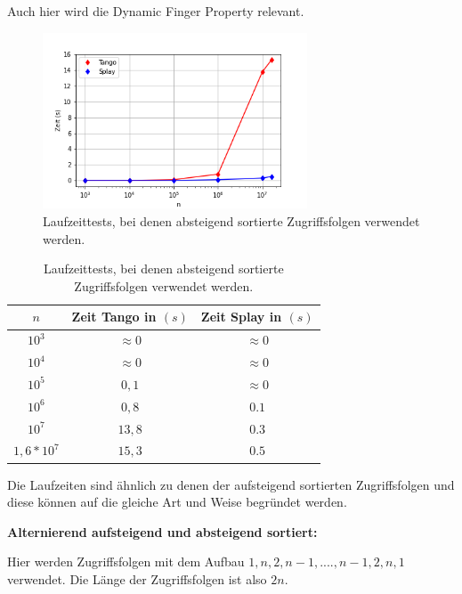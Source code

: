 \documentclass[a4paper,12pt]{article}
\begin{document}
\bigskip


\noindent Auch hier wird die Dynamic Finger Property relevant. 
\begin{figure}[H]
	\centering
	\includegraphics[width=0.7\textwidth]{Medien/laufzeittest/diagramm/sorted2}
	\caption{Laufzeittests, bei denen absteigend sortierte Zugriffsfolgen verwendet werden.}
\end{figure}
\begin{table}[H]
	\begin{center}
		\begin{tabular}[c]{|c|c|c|}
			\hline
		$n$ & Zeit Tango in $\left(s\right)$ &Zeit Splay in $\left(s\right)$ \\
		\hline
		$10^3$ & $\approx 0$ &$\approx 0$ \\
		\hline
		$10^4$  & $\approx 0$ &$\approx 0$  \\
		\hline
		$10^5$  & $0,1$ &$\approx 0$  \\
		\hline
		$10^6$  & $0,8$ &$0.1$  \\
		\hline
		$10^7$  & $13,8$ &$0.3$  \\
		\hline
		$1,6 *10^7$  & $15,3$ &$0.5$  \\
		\hline
		\end{tabular}
		\caption{Laufzeittests, bei denen absteigend sortierte Zugriffsfolgen verwendet werden.} 
	\end{center}
\end{table}
\noindent Die Laufzeiten sind ähnlich zu denen der aufsteigend sortierten Zugriffsfolgen und diese können auf die gleiche Art und Weise begründet werden.

 \bigskip
\noindent \textbf{Alternierend aufsteigend und absteigend sortiert:}

\bigskip
\noindent Hier werden Zugriffsfolgen mit dem Aufbau $1, n, 2, n- 1,...., n - 1, 2, n, 1$ verwendet. Die Länge der Zugriffsfolgen ist also $2n$.
\end{document}
